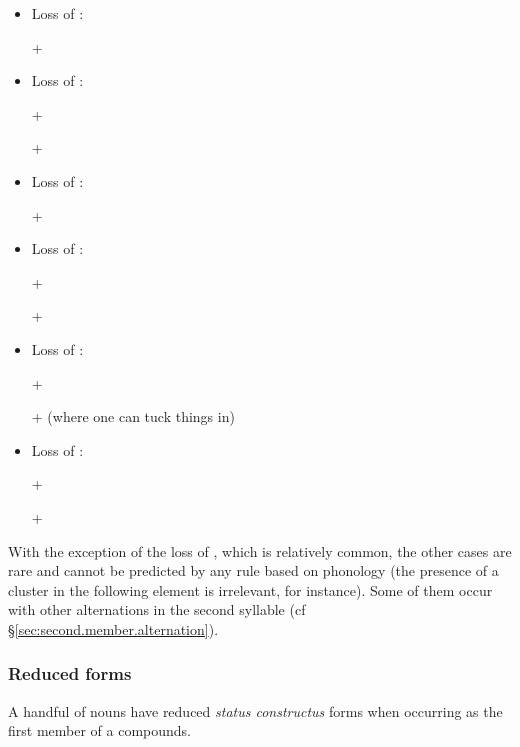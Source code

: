 \begin{itemize}
\item Loss of : 

  +  \fl{}    
\item Loss of  : 

 +  \fl{}   

  +  \fl{}   
\item Loss of : 

  +  \fl{}    
\item Loss of :

  +  \fl{}   

 +  \fl{}    
\item Loss of :

   +   \fl{}    
 
  +  \fl{}   (where one can tuck things in) 
\item Loss of : 

 +  \fl{}    

 +  \fl{}    
\end{itemize}

With the exception of the loss of , which is relatively common, the other cases are rare and cannot be predicted by any rule based on phonology (the presence of a cluster in the following element is irrelevant, for instance). Some of them occur with other alternations in the second syllable (cf §\ref{sec:second.member.alternation}).

\subsubsection{Reduced forms} \label{sec:reduced.forms.compounds}   
A handful of nouns have reduced \textit{status constructus} forms when occurring as the first member of a compounds. 

